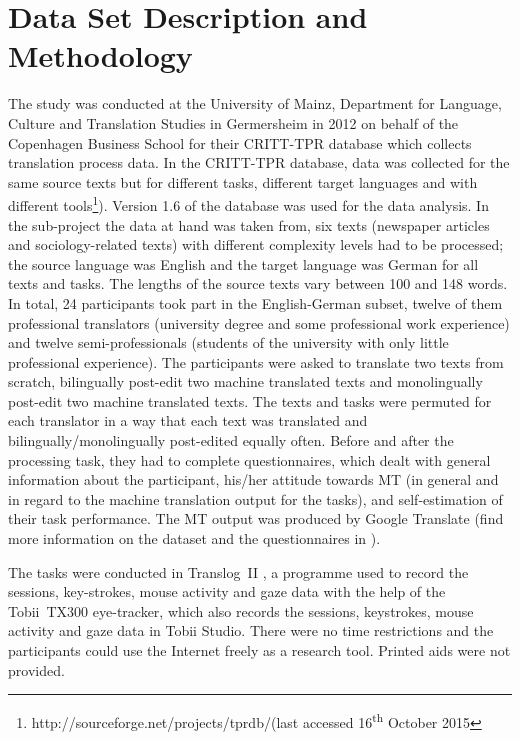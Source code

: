 \documentclass[output=paper]{langsci/langscibook}
\begin{document}
\section{Data Set Description and Methodology}

The study was conducted at the University of Mainz, Department for Language, Culture and Translation Studies in Germersheim in 2012 on behalf of the Copenhagen Business School for their CRITT-TPR database \citep{carl2012critt, carl2013} which collects translation process data. In the CRITT-TPR database, data was collected for the same source texts but for different tasks, different target languages and with different tools\footnote{http://sourceforge.net/projects/tprdb/(last accessed 16\textsuperscript{th} October 2015}). Version 1.6 of the database was used for the data analysis. In the sub-project the data at hand was taken from, six texts (newspaper articles and sociology-related texts) with different complexity levels had to be processed; the source language was English and the target language was German for all texts and tasks. The lengths of the source texts vary between 100 and 148 words. In total, 24 participants took part in the English-German subset, twelve of them professional translators (university degree and some professional work experience) and twelve semi-professionals (students of the university with only little professional experience). The participants were asked to translate two texts from scratch, bilingually post-edit two machine translated texts and monolingually post-edit two machine translated texts. The texts and tasks were permuted for each translator in a way that each text was translated and bilingually/monolingually post-edited equally often. Before and after the processing task, they had to complete questionnaires, which dealt with general information about the participant, his/her attitude towards MT (in general and in regard to the machine translation output for the tasks), and self-estimation of their task performance. The MT output was produced by Google Translate (find more information on the dataset and the questionnaires in \citet{carl2014}).


The tasks were conducted in Translog~II \citep{jakobsen2011, carl2012translog}, a programme used to record the sessions, key-strokes, mouse activity and gaze data with the help of the Tobii~TX300 eye-tracker, which also records the sessions, keystrokes, mouse activity and gaze data in Tobii Studio. There were no time restrictions and the participants could use the Internet freely as a research tool. Printed aids were not provided.
\end{document}
